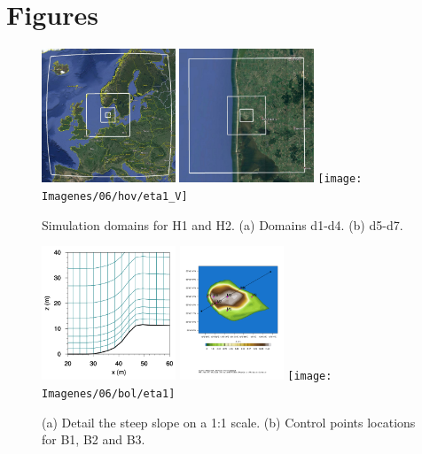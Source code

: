 \section*{Figures}
\begin{figure}[H]
	\centering
	\includegraphics[height=4cm,trim={5mm 3mm 3mm 3mm},clip,frame]{Imagenes/05/hov_dom1_edit.jpg}
	\includegraphics[height=4cm,trim={5mm 3mm 3mm 3mm},clip,frame]{Imagenes/05/hov_dom2_edit.jpg}
	\texttt{[image: Imagenes/06/hov/eta1\_V]}%
	\caption{Simulation domains for H1 and H2. (a) Domains d1-d4. (b) d5-d7.}
	\label{fig:05_dom_hov}
\end{figure}

%	

\begin{figure}[H]
	\centering
	\includegraphics[height=4cm,trim={0cm 5mm 0cm 0cm},clip]{Imagenes/05/hd_mesh_50}%
	\includegraphics[height=4cm,page=1,trim={3.4cm 9.3cm 1cm 4cm},clip]{Imagenes/05/bol_control_point.pdf}%
	\texttt{[image: Imagenes/06/bol/eta1]}%
	\caption{(a) Detail the steep slope on a 1:1 scale. (b) Control points locations for B1, B2 and B3. }
	\label{fig:05_mesh_bol}
\end{figure}

